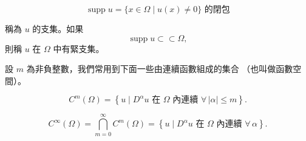 \documentclass[11pt,a4paper,twoside]{article}
\newif\ifstudynotes
\newcommand{\StudyNote}[2]{%
    \ifstudynotes
    \begin{studyNote}[title={#1}]
    #2
    \end{studyNote}
    \fi
}
\newcommand{\pnum}[1]{%
    \makebox[0pt][r]{%
        \scriptsize\textbf{[#1]}\hspace{0.7em}%
    }%
}
\newcommand{\supp}{\operatorname{supp}}
\begin{document}
\newpage


\[
    \supp u
    =
    \{x\in\Omega\mid u(x)\neq0\}\text{ 的閉包}
\]

\noindent
稱為 $u$ 的支集。如果
\[
    \supp u\subset \subset \Omega,
\]
則稱 $u$ 在 $\Omega$ 中有緊支集。

\StudyNote{複習註解：支集與緊支集}{
\[
    \supp u
    ={\{x\in\Omega\mid u(x)\neq0\}}
\]
可以把 $\supp u$ 直覺理解為「函數真正有活動的區域」。
若
\[
    \supp u\subset\subset\Omega,
\]
表示支集完整縮在 $\Omega$ 的內部，沒有碰到邊界 $\partial\Omega$；
因此在靠近邊界的一整個鄰域內，$u=0$。

要特別區分：$u|_{\partial\Omega}=0$ 只表示「邊界上的值為零」；
緊支集則要求函數在抵達邊界以前就已經變成零。
}

\noindent
\pnum{8}
設 $m$ 為非負整數，我們常用到下面一些由連續函數組成的集合
（也叫做函數空間）。

\[
    C^m(\Omega)
    =
    \left\{
    u\mid
    D^\alpha u\text{ 在 }\Omega\text{ 內連續 }
    \forall\,|\alpha|\leq m
    \right\}.
\]

\StudyNote{複習註解：$C^m(\Omega)$}{
    $C^m(\Omega)$ 表示所有「直到 $m$ 階偏導數都連續」的函數。
    其中 $|\alpha|$ 代表總微分階數，因此
    \[
        |\alpha|\le m
    \]
    就是要求所有 $0$ 階、$1$ 階、\ldots、$m$ 階偏導數都連續。
    例如二維中，$u\in C^2(\Omega)$ 表示
    \[
        u,\;u_x,\;u_y,\;u_{xx},\;u_{xy},\;u_{yx},\;u_{yy}
    \]
    皆連續。

    \[
        \boxed{C^m=\text{連續可微到 }m\text{ 階}}
    \]
}

\[
    C^\infty(\Omega)
    =
    \bigcap_{m=0}^{\infty}C^m(\Omega)
    =
    \left\{
    u\mid
    D^\alpha u\text{ 在 }\Omega\text{ 內連續 }
    \forall\,\alpha
    \right\}.
\]

\StudyNote{複習註解：$C^\infty(\Omega)$}{
    $C^\infty(\Omega)$ 稱為光滑函數空間（smooth functions）。
    \[
        C^\infty(\Omega)=\bigcap_{m=0}^{\infty}C^m(\Omega)
    \]
    表示函數同時屬於 $C^0(\Omega),C^1(\Omega),C^2(\Omega),\ldots$，
    也就是不論微分多少次，所得偏導數都存在且連續。

    \[
        C^\infty(\Omega)\subset\cdots\subset C^2(\Omega)\subset C^1(\Omega)\subset C^0(\Omega).
    \]

    \[
        \boxed{C^\infty=\text{無限次連續可微}}
    \]
}
\end{document}
